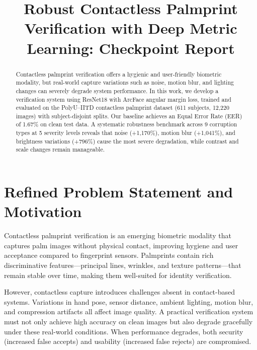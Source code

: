 \documentclass[conference]{IEEEtran}
\begin{document}
\title{Robust Contactless Palmprint Verification with Deep Metric Learning: Checkpoint Report}

\author{
}

\maketitle

\begin{abstract}
Contactless palmprint verification offers a hygienic and user-friendly biometric modality, but real-world capture variations such as noise, motion blur, and lighting changes can severely degrade system performance. In this work, we develop a verification system using ResNet18 with ArcFace angular margin loss, trained and evaluated on the PolyU--IITD contactless palmprint dataset (611 subjects, 12,220 images) with subject-disjoint splits. Our baseline achieves an Equal Error Rate (EER) of 1.67\% on clean test data. A systematic robustness benchmark across 9 corruption types at 5 severity levels reveals that noise (+1,170\%), motion blur (+1,041\%), and brightness variations (+796\%) cause the most severe degradation, while contrast and scale changes remain manageable.
\end{abstract}

\section{Refined Problem Statement and Motivation}

Contactless palmprint verification is an emerging biometric modality that captures palm images without physical contact, improving hygiene and user acceptance compared to fingerprint sensors. Palmprints contain rich discriminative features---principal lines, wrinkles, and texture patterns---that remain stable over time, making them well-suited for identity verification.

However, contactless capture introduces challenges absent in contact-based systems. Variations in hand pose, sensor distance, ambient lighting, motion blur, and compression artifacts all affect image quality. A practical verification system must not only achieve high accuracy on clean images but also degrade gracefully under these real-world conditions. When performance degrades, both security (increased false accepts) and usability (increased false rejects) are compromised.
\end{document}
